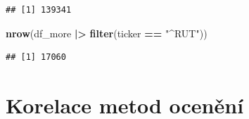 \documentclass[
]{article}
\newenvironment{Shaded}{\begin{snugshade}}{\end{snugshade}}
\newcommand{\FunctionTok}[1]{\textcolor[rgb]{0.13,0.29,0.53}{\textbf{#1}}}
\newcommand{\NormalTok}[1]{#1}
\newcommand{\SpecialCharTok}[1]{\textcolor[rgb]{0.81,0.36,0.00}{\textbf{#1}}}
\newcommand{\StringTok}[1]{\textcolor[rgb]{0.31,0.60,0.02}{#1}}
\begin{document}
\begin{verbatim}
## [1] 139341
\end{verbatim}

\begin{Shaded}
\begin{Highlighting}[]
\FunctionTok{nrow}\NormalTok{(df\_more }\SpecialCharTok{|\textgreater{}} \FunctionTok{filter}\NormalTok{(ticker }\SpecialCharTok{==} \StringTok{"\^{}RUT"}\NormalTok{))}
\end{Highlighting}
\end{Shaded}

\begin{verbatim}
## [1] 17060
\end{verbatim}

\section{Korelace metod ocenění}\label{korelace-metod-ocenux11bnuxed}
\end{document}
